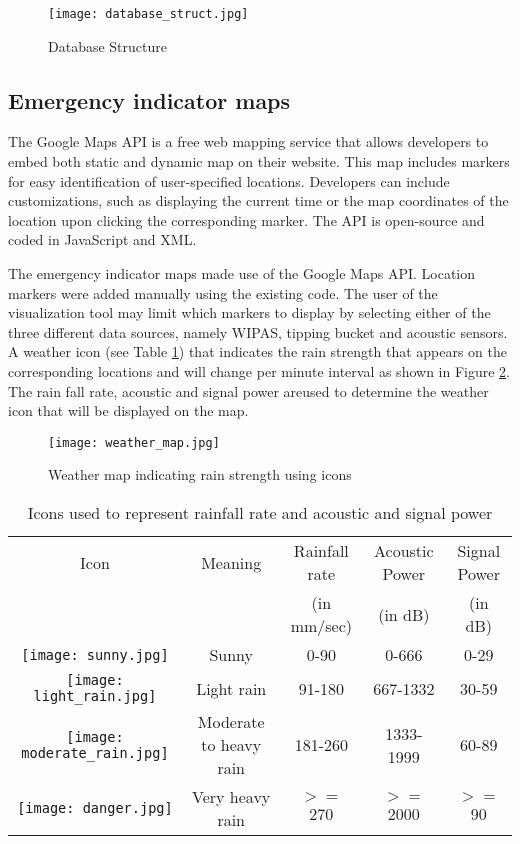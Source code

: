 \begin{figure}
    \centering
        \texttt{[image: database\_struct.jpg]}
    \caption{Database Structure}
    \label{fig:database_struct}
\end{figure}

\subsection{Emergency indicator maps}
The Google Maps API is a free web mapping service that allows developers to embed both static and dynamic map on their website. This map includes markers for easy identification of user-specified locations. Developers can include customizations, such as displaying the current time or the map coordinates of the location upon clicking the corresponding marker. The API is open-source and coded in JavaScript and XML.

\bigskip
The emergency indicator maps made use of the Google Maps API. Location markers were added manually using the existing code. The user of the visualization tool may limit which markers to display by selecting either of the three different data sources, namely WIPAS, tipping bucket and acoustic sensors. A weather icon (see Table \ref{table:weather_icons}) that indicates the rain strength that appears on the corresponding locations and will change per minute interval as shown in Figure \ref{fig:weather_map}. The rain fall rate, acoustic and signal power areused to determine the weather icon that will be displayed on the map. 

\begin{figure}
    \centering
        \texttt{[image: weather\_map.jpg]}
    \caption{Weather map indicating rain strength using icons}
    \label{fig:weather_map}
\end{figure}

\bigskip
\begin{table}
\caption{Icons used to represent rainfall rate and acoustic and signal power}
\centering
\begin{tabular}{c c c c c}%
\hline\hline
Icon & Meaning & Rainfall rate & Acoustic Power & Signal Power
 \\ & & (in mm/sec) & (in dB) & (in dB) \\ [0.5ex]
\hline
\texttt{[image: sunny.jpg]} & Sunny & 0-90 & 0-666 & 0-29 \\
\texttt{[image: light\_rain.jpg]} & Light rain & 91-180 & 667-1332 & 30-59 \\
\texttt{[image: moderate\_rain.jpg]} & Moderate to heavy rain & 181-260 & 1333-1999 & 60-89 \\ 
\texttt{[image: danger.jpg]} & Very heavy rain & $>=$ 270 & $>=$ 2000 & $>=$ 90  \\[1ex ]
\hline
\end{tabular}
\label{table:weather_icons}
\end{table}


